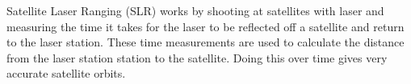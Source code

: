Satellite Laser Ranging (SLR) works by shooting at satellites with laser and
measuring the time it takes for the laser to be reflected off a satellite and
return to the laser station. These time measurements are used to calculate the
distance from the laser station station to the satellite. Doing this over time
gives very accurate satellite orbits.

\endinput
